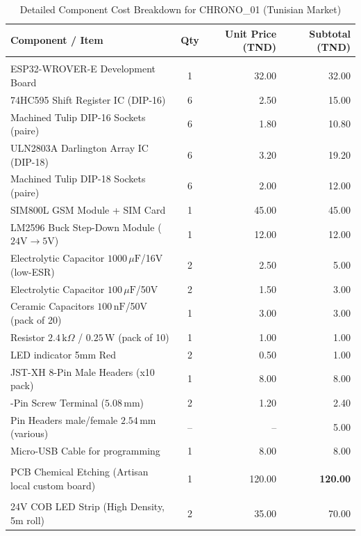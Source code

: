 \documentclass[12pt,a4paper,oneside]{report}
\begin{document}
\begin{table}[H]
\centering
\small
\caption{Detailed Component Cost Breakdown for CHRONO\_01 (Tunisian Market)}
\label{tab:cost_bom}
\begin{tabularx}{\textwidth}{>{\raggedright\arraybackslash}X c r r}
\toprule
\textbf{Component / Item} & \textbf{Qty} & \textbf{Unit Price (TND)} & \textbf{Subtotal (TND)} \\
\midrule
\multicolumn{4}{l}{\textit{\textbf{Electronic Components}}} \\
ESP32-WROVER-E Development Board & 1 & 32.00 & 32.00 \\
74HC595 Shift Register IC (DIP-16) & 6 & 2.50 & 15.00 \\
Machined Tulip DIP-16 Sockets (paire) & 6 & 1.80 & 10.80 \\
ULN2803A Darlington Array IC (DIP-18) & 6 & 3.20 & 19.20 \\
Machined Tulip DIP-18 Sockets (paire) & 6 & 2.00 & 12.00 \\
SIM800L GSM Module + SIM Card & 1 & 45.00 & 45.00 \\
LM2596 Buck Step-Down Module ($24\text{V}\to5\text{V}$) & 1 & 12.00 & 12.00 \\
Electrolytic Capacitor $1000\,\mu\text{F}$/16V (low-ESR) & 2 & 2.50 & 5.00 \\
Electrolytic Capacitor $100\,\mu\text{F}$/50V & 2 & 1.50 & 3.00 \\
Ceramic Capacitors $100\,\text{nF}$/50V (pack of 20) & 1 & 3.00 & 3.00 \\
Resistor $2.4\,\text{k}\Omega$ / $0.25\,\text{W}$ (pack of 10) & 1 & 1.00 & 1.00 \\
LED indicator 5mm Red & 2 & 0.50 & 1.00 \\
JST-XH 8-Pin Male Headers (x10 pack) & 1 & 8.00 & 8.00 \\
2-Pin Screw Terminal ($5.08\,\text{mm}$) & 2 & 1.20 & 2.40 \\
Pin Headers male/female $2.54\,\text{mm}$ (various) & -- & -- & 5.00 \\
Micro-USB Cable for programming & 1 & 8.00 & 8.00 \\
\midrule
\multicolumn{4}{l}{\textit{\textbf{PCB Fabrication}}} \\
PCB Chemical Etching (Artisan local custom board) & 1 & 120.00 & \textbf{120.00} \\
\midrule
\multicolumn{4}{l}{\textit{\textbf{Display Mechanical Structure}}} \\
24V COB LED Strip (High Density, 5m roll) & 2 & 35.00 & 70.00 \\

\end{tabularx}
\end{table}
\end{document}
